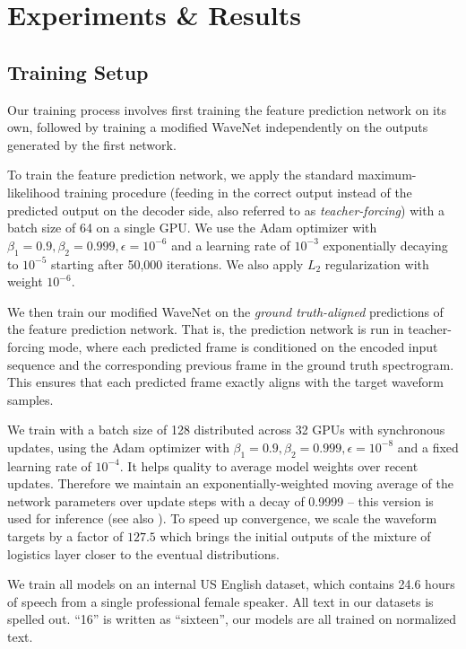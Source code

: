\section{Experiments \& Results}
\label{sec:experiments}

\subsection{Training Setup}
Our training process involves first training the feature prediction network
on its own, followed by training a modified WaveNet independently on the outputs
generated by the first network.

To train the feature prediction network, we apply the standard
maximum-likelihood training procedure (feeding in the
correct output instead of the predicted output on the decoder side, also
referred to as {\em teacher-forcing})
with a batch size of 64 on a single GPU. We use the Adam optimizer
\cite{DBLP:journals/corr/KingmaB14} with
$\beta_1=0.9, \beta_2=0.999, \epsilon=10^{-6}$ and a learning rate of
$10^{-3}$ exponentially decaying to $10^{-5}$ starting after 50,000 iterations.
We also apply $L_2$ regularization with weight $10^{-6}$.

We then train our modified WaveNet on the \emph{ground truth-aligned}
predictions of the feature prediction network.
That is, the prediction network is run in teacher-forcing mode,
where each predicted frame is conditioned on the encoded input sequence and the
corresponding previous frame in the ground truth spectrogram. This ensures that
each predicted frame exactly aligns with the target waveform samples.

We train with a batch size of 128 distributed across 32 GPUs
with synchronous updates, using the Adam optimizer with
$\beta_1=0.9, \beta_2=0.999, \epsilon=10^{-8}$ and a fixed learning rate of
$10^{-4}$. It helps quality to average model weights over recent updates.  Therefore
we maintain an exponentially-weighted moving average of the network parameters
over update steps with a decay of 0.9999 -- this version is used for inference
(see also \cite{DBLP:journals/corr/KingmaB14}).
%
To speed up convergence, we scale the waveform targets by a factor of $127.5$
which brings the initial outputs of the mixture of logistics layer closer to
the eventual distributions.

We train all models on an internal US English dataset\cite{46150}, which
contains 24.6 hours of speech from a single professional female speaker.
%
All text in our datasets is spelled out. \eg ``16'' is written as ``sixteen'',
\ie our models are all trained on normalized text.

